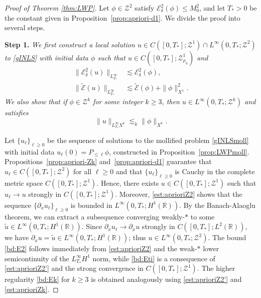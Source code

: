 \documentclass{amsart}
\numberwithin{equation}{section}
\newcommand{\R}{\mathbb{R}}
\begin{document}
\begin{proof}[Proof of Theorem \ref{thm:LWP}]
Let $\phi\in \mathcal{Z}^2$ satisfy $\mathcal{E}^2_\delta(\phi)\leq M_0^2$, and let $T_*>0$ be the constant given in Proposition~\ref{prop:apriori-d1}.
We divide the proof into several steps.


\medskip
\noindent \textbf{Step 1.} 
\textit{We first construct a local solution $u\in C([0,T_*];\mathcal{Z}^1)\cap L^\infty(0,T_*;\mathcal{Z}^2)$ to \eqref{gINLS} with initial data $\phi$ such that $u\in C([0,T_*];\mathcal{Z}^1_{\rho_\phi})$ and
\begin{align}
\big\| \mathcal{E}^2_\delta(u)\big\|_{L^\infty_{T_*}}&\lesssim \mathcal{E}^2_\delta(\phi), \label{bd:E2} \\
\| \widetilde{\mathcal{E}}(u)\|_{L^\infty_{T_*}}&\lesssim \widetilde{\mathcal{E}}(\phi) +\| \phi\|_{X^1}^2. \label{bd:Eti}
\end{align}
We also show that if $\phi\in \mathcal{Z}^k$ for some integer $k\geq 3$, then $u\in L^\infty(0,T_*;\mathcal{Z}^k)$ and satisfies
\begin{equation}\label{bd:Ek}
\| u\|_{L^\infty_{T_*}X^k}\lesssim_k \| \phi\|_{X^k}.
\end{equation}}

Let $\{ u_\ell\}_{\ell\geq 0}$ be the sequence of solutions to the mollified problem \eqref{gINLSmoll} with initial data $u_\ell(0)=P_{\leq \ell}\phi$, constructed in Proposition~\ref{prop:LWPmoll}. Propositions~\ref{prop:apriori-Zk} and~\ref{prop:apriori-d1} guarantee that \(u_\ell\in C([0,T_*];\mathcal{Z}^2)\) for all \(\ell\geq 0\) and that \(\{ u_\ell\}_{\ell\geq 0}\) is Cauchy in the complete metric space \(C([0,T_*];\mathcal{Z}^1)\).
Hence, there exists \(u\in C([0,T_*];\mathcal{Z}^1)\) such that \(u_\ell\to u\) strongly in \(C([0,T_*];\mathcal{Z}^1)\).
Moreover, \eqref{est:aprioriZ2} shows that the sequence \(\{ \partial_xu_\ell\}_{\ell\geq 0}\) is bounded in \(L^\infty(0,T_*;H^1(\R))\). By the Banach-Alaoglu theorem, we can extract a subsequence converging weakly-$*$ to some $\widetilde{u}\in L^\infty(0,T_*;H^1(\R))$. Since \(\partial_xu_\ell\to \partial_xu\) strongly in \(C([0,T_*];L^2(\R))\), we have \(\partial_xu=\widetilde{u}\in L^\infty(0,T_*;H^1(\R))\); thus \(u\in L^\infty(0,T_*;\mathcal{Z}^2)\). The bound \eqref{bd:E2} follows immediately from \eqref{est:aprioriZ2} and the weak-$*$ lower semicontinuity of the $L^\infty_{T_*}H^1$ norm, {while \eqref{bd:Eti} is a consequence of \eqref{est:aprioriZ2'} and the strong convergence in $C([0,T_*];\mathcal{Z}^1)$}. The higher regularity \eqref{bd:Ek} for \(k\geq 3\) is obtained analogously using \eqref{est:aprioriZ2'} and \eqref{est:aprioriZk}.


\end{proof}
\end{document}
